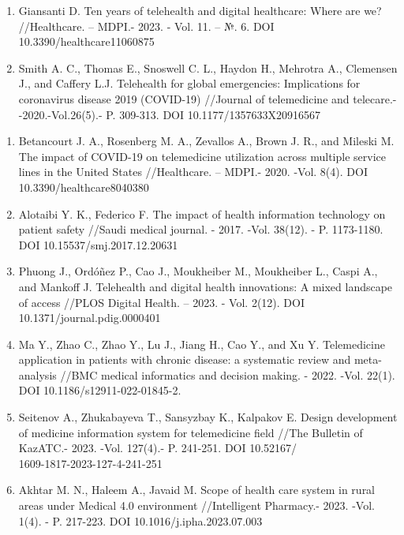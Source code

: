 \begin{noparindent}

\begin{enumerate}
\def\labelenumi{\arabic{enumi}.}
\item
  Giansanti D. Ten years of telehealth and digital healthcare: Where are
  we? //Healthcare. -- MDPI.- 2023. - Vol. 11. -- №. 6. DOI
  10.3390/healthcare11060875
\item
  Smith A. C., Thomas E., Snoswell C. L., Haydon H., Mehrotra A.,
  Clemensen J., and Caffery L.J. Telehealth for global emergencies:
  Implications for coronavirus disease 2019 (COVID-19) //Journal of
  telemedicine and telecare.- -2020.-Vol.26(5).- P. 309-313. DOI 10.1177/1357633X20916567
\end{enumerate}


\begin{enumerate}
\def\labelenumi{\arabic{enumi}.}
\setcounter{enumi}{2}
\item
  Betancourt J. A., Rosenberg M. A., Zevallos A., Brown J. R., and
  Mileski M. The impact of COVID-19 on telemedicine utilization across
  multiple service lines in the United States //Healthcare. -- MDPI.-
  2020. -Vol. 8(4). DOI 10.3390/healthcare8040380
\item
  Alotaibi Y. K., Federico F. The impact of health information
  technology on patient safety //Saudi medical journal. - 2017. -Vol.
  38(12). - P. 1173-1180. DOI 10.15537/smj.2017.12.20631
\item
  Phuong J., Ordóñez P., Cao J., Moukheiber M., Moukheiber L., Caspi A.,
  and Mankoff J. Telehealth and digital health innovations: A mixed
  landscape of access //PLOS Digital Health. -- 2023. - Vol. 2(12). DOI
  10.1371/journal.pdig.0000401
\item
  Ma Y., Zhao C., Zhao Y., Lu J., Jiang H., Cao Y., and Xu Y.
  Telemedicine application in patients with chronic disease: a
  systematic review and meta-analysis //BMC medical informatics and
  decision making. - 2022. -Vol. 22(1). DOI 10.1186/s12911-022-01845-2.
\item
  Seitenov A., Zhukabayeva T., Sansyzbay K., Kalpakov E. Design
  development of medicine information system for telemedicine field
  //The Bulletin of KazATC.- 2023. -Vol. 127(4).- P. 241-251. DOI
  10.52167/\\1609-1817-2023-127-4-241-251

\item
Akhtar M. N., Haleem A., Javaid M. Scope of health care system in rural
areas under Medical 4.0 environment //Intelligent Pharmacy.- 2023. -Vol.
1(4). - P. 217-223. DOI 10.1016/j.ipha.2023.07.003


\end{enumerate}
\end{noparindent}
